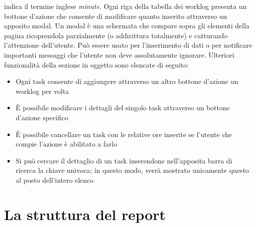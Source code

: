 indica il termine inglese \emph{minute}.
Ogni riga della tabella dei worklog presenta un bottone d'azione che consente di modificare quanto inserito attraverso un apposito modal.
Un modal è una schermata che compare sopra gli elementi della pagina ricoprendola parzialmente (o addirittura totalmente) e catturando l'attenzione dell'utente.
Può essere usato per l'inserimento di dati o per notificare importanti messaggi che l'utente non deve assolutamente ignorare.
Ulteriori funzionalità della sezione in oggetto sono elencate di seguito:
\begin{itemize}
    \item Ogni task consente di aggiungere attraverso un altro bottone d'azione un worklog per volta
    \item È possibile modificare i dettagli del singolo task attraverso un bottone d'azione specifico
    \item È possibile cancellare un task con le relative ore inserite se l'utente che compie l'azione è abilitato a farlo
    \item Si può cercare il dettaglio di un task inserendone nell'apposita barra di ricerca la chiave univoca; in questo modo, verrà mostrato unicamente questo al posto
    dell'intero elenco
\end{itemize}

\section{La struttura del report}

